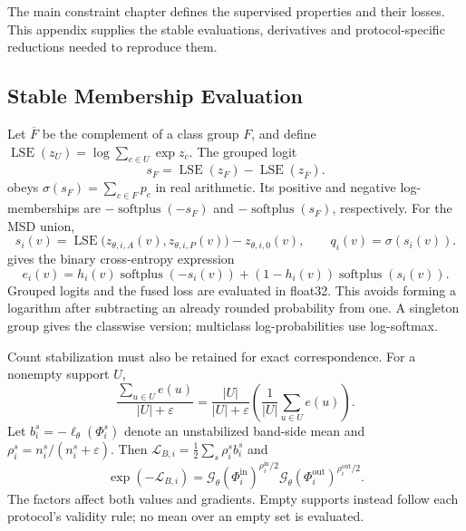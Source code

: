 The main constraint chapter defines the supervised properties and their
losses. This appendix supplies the stable evaluations, derivatives and
protocol-specific reductions needed to reproduce them.

\subsection{Stable Membership Evaluation}

Let $\overline F$ be the complement of a class group $F$, and define
$\operatorname{LSE}(z_U)=\log\sum_{c\in U}\exp z_c$. The grouped logit
\begin{equation}
s_F=\operatorname{LSE}(z_F)-\operatorname{LSE}(z_{\overline{F}}).
\label{eq:grouped-predicate-logit}
\end{equation}
obeys $\sigma(s_F)=\sum_{c\in F}p_c$ in real arithmetic. Its positive
and negative log-memberships are
$-\operatorname{softplus}(-s_F)$ and
$-\operatorname{softplus}(s_F)$, respectively. For the MSD union,
\begin{equation}
s_i(v)=\operatorname{LSE}\bigl(z_{\theta,i,A}(v),
                              z_{\theta,i,P}(v)\bigr)
        -z_{\theta,i,0}(v),
\qquad q_i(v)=\sigma(s_i(v)).
\label{eq:msd-band-logit}
\end{equation}
gives the binary cross-entropy expression
\begin{equation}
e_i(v)=h_i(v)\operatorname{softplus}(-s_i(v))
       +(1-h_i(v))\operatorname{softplus}(s_i(v)).
\label{eq:band-stable-bce}
\end{equation}
Grouped logits and the fused loss are evaluated in float32. This avoids
forming a logarithm after subtracting an already rounded probability
from one. A singleton group gives the classwise version; multiclass
log-probabilities use log-softmax.

Count stabilization must also be retained for exact correspondence.
For a nonempty support $U$,
\begin{equation}
\frac{\sum_{u\in U}e(u)}{|U|+\varepsilon}
=\frac{|U|}{|U|+\varepsilon}
\left(\frac{1}{|U|}\sum_{u\in U}e(u)\right).
\label{eq:stabilized-quantifier-reduction}
\end{equation}
Let $b_i^s=-\ell_\theta(\Phi_i^s)$ denote an unstabilized band-side
mean and $\rho_i^s=n_i^s/(n_i^s+\varepsilon)$. Then
$\mathcal L_{B,i}=\tfrac12\sum_s\rho_i^s b_i^s$ and
\begin{equation}
\exp(-\mathcal{L}_{B,i})
=\mathcal{G}_\theta(\Phi_i^{\mathrm{in}})^{\rho_i^{\mathrm{in}}/2}
 \mathcal{G}_\theta(\Phi_i^{\mathrm{out}})^{\rho_i^{\mathrm{out}}/2}.
\label{eq:balanced-band-satisfaction}
\end{equation}
The factors affect both values and gradients. Empty supports instead
follow each protocol's validity rule; no mean over an empty set is
evaluated.

